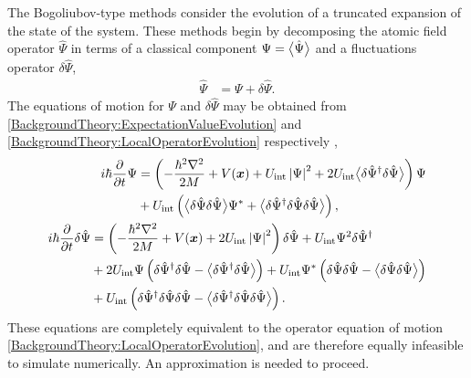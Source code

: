The Bogoliubov-type methods consider the evolution of a truncated expansion of the state of the system.  These methods begin by decomposing the atomic field operator $\hat{\Psi}$ in terms of a classical component $\Psi = {\big<\hat{\Psi}\big>}$ and a fluctuations operator $\delta \hat{\Psi}$,
\begin{align}
    \hat{\Psi} &= \Psi + \delta \hat{\Psi}.
\end{align}
The equations of motion for $\Psi$ and $\delta\hat{\Psi}$ may be obtained from \eqref{BackgroundTheory:ExpectationValueEvolution} and \eqref{BackgroundTheory:LocalOperatorEvolution} respectively \citep{Proukakis:2008},
\begin{subequations}
    \label{BackgroundTheory:Bogoliubov:GeneralEvolutionEquations}
    \begin{align}
        \begin{split}
            i \hbar \frac{\partial}{\partial t} \Psi &= \left(- \frac{\hbar^2 \nabla^2}{2 M} + V(\vect{x}) + U_\text{int} \abs{\Psi}^2 + 2 U_\text{int} \mean{\delta\hat{\Psi}^\dagger \delta\hat{\Psi}} \right) \Psi\\
            & + U_\text{int} \left(\mean{\delta\hat{\Psi} \delta\hat{\Psi}} \Psi^* + \mean{\delta\hat{\Psi}^\dagger \delta\hat{\Psi} \delta\hat{\Psi}} \right),
        \end{split} \label{BackgroundTheory:Bogoliubov:OrderParameterEvolution}\\
        \begin{split}
            i \hbar \frac{\partial}{\partial t} \delta\hat{\Psi} &= \left(-\frac{\hbar^2 \nabla^2}{2 M} + V(\vect{x}) + 2 U_\text{int} \abs{\Psi}^2 \right)\delta \hat{\Psi} + U_\text{int} \Psi^2 \delta \hat{\Psi}^\dagger\\
            &+ 2 U_\text{int} \Psi \left(\delta\hat{\Psi}^\dagger\delta\hat{\Psi} - \mean{\delta\hat{\Psi}^\dagger\delta\hat{\Psi}} \right)+ U_\text{int} \Psi^* \left(\delta \hat{\Psi}\delta \hat{\Psi} - \mean{\delta \hat{\Psi}\delta \hat{\Psi}} \right)\\
            &+ U_\text{int} \left(\delta\hat{\Psi}^\dagger \delta\hat{\Psi} \delta\hat{\Psi} - \mean{\delta\hat{\Psi}^\dagger \delta\hat{\Psi} \delta\hat{\Psi}} \right).
        \end{split} \label{BackgroundTheory:Bogoliubov:FluctuationOperatorEvolution}
    \end{align}
\end{subequations}
These equations are completely equivalent to the operator equation of motion \eqref{BackgroundTheory:LocalOperatorEvolution}, and are therefore equally infeasible to simulate numerically.  An approximation is needed to proceed.

